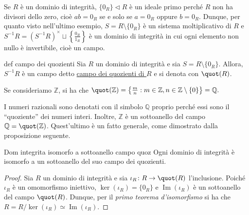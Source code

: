 
\begin{obs} 
  Se $R$ è un dominio di integrità, $\{0_R\}\lhd R$ è un ideale primo perché $R$ non ha divisori dello zero, 
  cioè $ab=0_R$ se e solo se $a=0_R$ oppure $b=0_R$. Dunque, per quanto visto nell'ultimo esempio, 
  $S=R\setminus \{0_R\}$ è un sistema moltiplicativo di $R$ e $S^{-1}R=(S^{-1}R)^{\times} \sqcup \left\{ \frac{0_R}{1_R} \right\}$ 
  è un dominio di integrità in cui ogni elemento non nullo è invertibile, cioè un campo.
\end{obs}

\begin{defn}{def campo dei quozienti}
  Sia $R$ un dominio di integrità e sia $S=R\setminus \{0_R\}$. Allora, $S^{-1}R$ è un campo detto \underline{campo dei quozienti di $R$} e 
  si denota con $\quot(R)$.
\end{defn}

\begin{exm}
  Se consideriamo $\mathbb{Z}$, si ha che $\quot(\mathbb{Z})=\left\{\frac{m}{n}: m\in \mathbb{Z}, n\in\mathbb{Z}\setminus\{0\}\right\}=\mathbb{Q}.$
\end{exm}

\noindent I numeri razionali sono denotati con il simbolo $\mathbb{Q}$ proprio perché essi sono il ``quoziente''  dei numeri interi. Inoltre, $\mathbb{Z}$ è un sottoanello del campo $\mathbb{Q}=\quot(\mathbb{Z})$. Quest'ultimo è un fatto generale, come dimostrato dalla proposizione seguente.

\begin{prop}[1.7.4]{Dom integrita isomorfo a sottoanello campo quoz}
  Ogni dominio di integrità è isomorfo a un sottoanello del suo campo dei quozienti.
\end{prop}
\vspace{-4mm}
\begin{proof}
  Sia $R$ un dominio di integrità e sia $\iota_R\colon R\rightarrow \quot(R)$ l'inclusione. 
  Poiché $\iota_R$ è un omomorfismo iniettivo, $\ker(\iota_R)=\{0_R\}$ e $\operatorname{Im}(\iota_R)$ è un sottoanello del campo $\quot(R)$. 
  Dunque, per il \emph{primo teorema d'isomorfismo} si ha che $R=R/\ker(\iota_R)\simeq \operatorname{Im}(\iota_R)$.
\end{proof}

